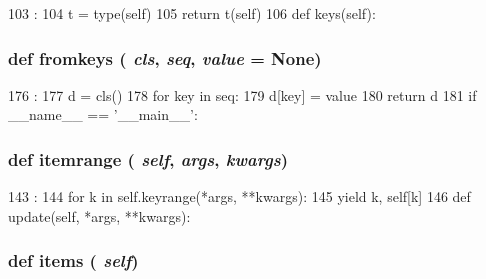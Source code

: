\begin{DoxyCode}
103                   :
104         t = type(self)
105         return t(self)
106 
    def keys(self):
\end{DoxyCode}
\hypertarget{classm5_1_1util_1_1sorteddict_1_1SortedDict_ad967d0a16057fd802496e994ea5673b2}{
\subsubsection[{fromkeys}]{\setlength{\rightskip}{0pt plus 5cm}def fromkeys ( {\em cls}, \/   {\em seq}, \/   {\em value} = {\ttfamily None})}}
\label{classm5_1_1util_1_1sorteddict_1_1SortedDict_ad967d0a16057fd802496e994ea5673b2}



\begin{DoxyCode}
176                                       :
177         d = cls()
178         for key in seq:
179             d[key] = value
180         return d
181 
if __name__ == '__main__':
\end{DoxyCode}
\hypertarget{classm5_1_1util_1_1sorteddict_1_1SortedDict_a8d553093aad148b18f0ea9907dfe028f}{
\subsubsection[{itemrange}]{\setlength{\rightskip}{0pt plus 5cm}def itemrange ( {\em self}, \/   {\em args}, \/   {\em kwargs})}}
\label{classm5_1_1util_1_1sorteddict_1_1SortedDict_a8d553093aad148b18f0ea9907dfe028f}



\begin{DoxyCode}
143                                         :
144         for k in self.keyrange(*args, **kwargs):
145             yield k, self[k]
146 
    def update(self, *args, **kwargs):
\end{DoxyCode}
\hypertarget{classm5_1_1util_1_1sorteddict_1_1SortedDict_a717291221885735d6870d7179083ec07}{
\subsubsection[{items}]{\setlength{\rightskip}{0pt plus 5cm}def items ( {\em self})}}
\label{classm5_1_1util_1_1sorteddict_1_1SortedDict_a717291221885735d6870d7179083ec07}



